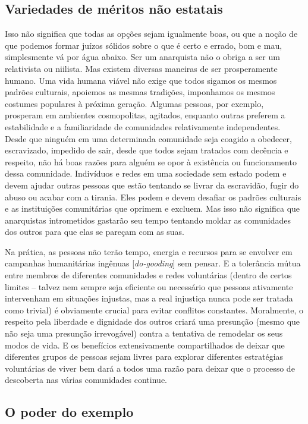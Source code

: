 \subsection*{Variedades de méritos não estatais}

Isso não significa que todas as opções sejam igualmente boas, ou que a noção de que podemos formar juízos sólidos sobre o que é certo e errado, bom e mau, simplesmente vá por água abaixo. Ser um anarquista não o obriga a ser um relativista ou niilista. Mas existem diversas maneiras de ser prosperamente humano. Uma vida humana viável não exige que todos sigamos os mesmos padrões culturais, apoiemos as mesmas tradições, imponhamos os mesmos costumes populares à próxima geração. Algumas pessoas, por exemplo, prosperam em ambientes cosmopolitas, agitados, enquanto outras preferem a estabilidade e a familiaridade de comunidades relativamente independentes. Desde que ninguém em uma determinada comunidade seja coagido a obedecer, escravizado, impedido de sair, desde que todos sejam tratados com decência e respeito, não há boas razões para alguém se opor à existência ou funcionamento dessa comunidade. Indivíduos e redes em uma sociedade sem estado podem e devem ajudar outras pessoas que estão tentando se livrar da escravidão, fugir do abuso ou acabar com a tirania. Eles podem e devem desafiar os padrões culturais e as instituições comunitárias que oprimem e excluem. Mas isso não significa que anarquistas intrometidos gastarão seu tempo tentando moldar as comunidades dos outros para que elas se pareçam com as suas.

Na prática, as pessoas não terão tempo, energia e recursos para se envolver em campanhas humanitárias ingênuas [\emph{do-gooding}] sem pensar. E a tolerância mútua entre membros de diferentes comunidades e redes voluntárias (dentro de certos limites -- talvez nem sempre seja eficiente ou necessário que pessoas ativamente intervenham em situações injustas, mas a real injustiça nunca pode ser tratada como trivial) é obviamente crucial para evitar conflitos constantes. Moralmente, o respeito pela liberdade e dignidade dos outros criará uma presunção (mesmo que não seja uma presunção irrevogável) contra a tentativa de remodelar os seus modos de vida. E os benefícios extensivamente compartilhados de deixar que diferentes grupos de pessoas sejam livres para explorar diferentes estratégias voluntárias de viver bem dará a todos uma razão para deixar que o processo de descoberta nas várias comunidades continue.

\subsection*{O poder do exemplo}

